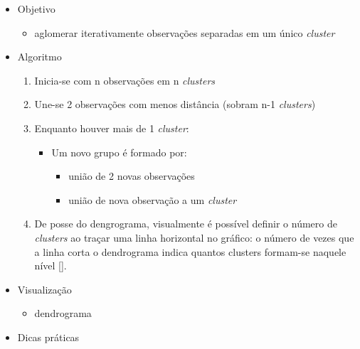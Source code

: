 \documentclass[
  letterpaper,
  DIV=11,
  numbers=noendperiod]{scrreprt}
\providecommand{\tightlist}{%
  \setlength{\itemsep}{0pt}\setlength{\parskip}{0pt}}\usepackage{longtable,booktabs,array}
\begin{document}
\begin{itemize}
\tightlist
\item
  Objetivo

  \begin{itemize}
  \tightlist
  \item
    aglomerar iterativamente observações separadas em um único
    \emph{cluster}
  \end{itemize}
\item
  Algoritmo

  \begin{enumerate}
  \def\labelenumi{\arabic{enumi}.}
  \tightlist
  \item
    Inicia-se com n observações em n \emph{clusters}
  \item
    Une-se 2 observações com menos distância (sobram n-1
    \emph{clusters})
  \item
    Enquanto houver mais de 1 \emph{cluster}:

    \begin{itemize}
    \tightlist
    \item
      Um novo grupo é formado por:

      \begin{itemize}
      \tightlist
      \item
        união de 2 novas observações
      \item
        união de nova observação a um \emph{cluster}
      \end{itemize}
    \end{itemize}
  \item
    De posse do dengrograma, visualmente é possível definir o número de
    \emph{clusters} ao traçar uma linha horizontal no gráfico: o número
    de vezes que a linha corta o dendrograma indica quantos clusters
    formam-se naquele nível {[}{]}.
  \end{enumerate}
\item
  Visualização

  \begin{itemize}
  \tightlist
  \item
    dendrograma
  \end{itemize}
\item
  Dicas práticas


\end{itemize}
\end{document}
